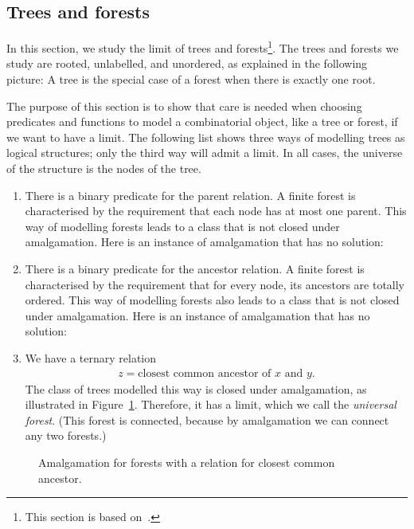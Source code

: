 \subsection{Trees and forests}
\label{sec:trees}

In this section, we study the \fraisse limit of trees and forests\footnote{This section is based on~\cite{DBLP:conf/pods/BojanczykST13}.}.
The trees and forests we study are rooted, unlabelled, and unordered, as explained in the following picture: 
A tree is the special case of a forest when there is exactly one root. 

The purpose of this section is to show that care is needed when choosing predicates and functions to model a combinatorial object, like a tree or forest, if we want to have a \fraisse limit. The following list shows three ways of modelling trees as logical structures; only the third way will admit a \fraisse limit. In all cases, the universe of the structure is the nodes of the tree.
\begin{enumerate}
 \item There is a binary predicate for the parent relation. A finite forest is characterised by the requirement that each node has at most one parent. This way of modelling forests leads to a class that is not closed under amalgamation. Here is an instance of amalgamation that has no solution:
 \item There is a binary predicate for the ancestor relation. A finite forest is characterised by the requirement that for every node, its ancestors are totally ordered. This way of modelling forests also leads to a class that is not closed under amalgamation. Here is an instance of amalgamation that has no solution:
 \item We have a ternary relation 
 \begin{align*}
 z = \text{closest common ancestor of $x$ and $y$}.
 \end{align*}
 The class of trees modelled this way is closed under amalgamation, as illustrated in Figure~\ref{fig:trees-amalg}. Therefore, it has a \fraisse limit, which we call the \emph{universal forest}. (This forest is connected, because by amalgamation we can connect any two forests.) 
\end{enumerate}

\begin{figure}
 \caption{\label{fig:trees-amalg} Amalgamation for forests with a relation for closest common ancestor.}
\end{figure}

